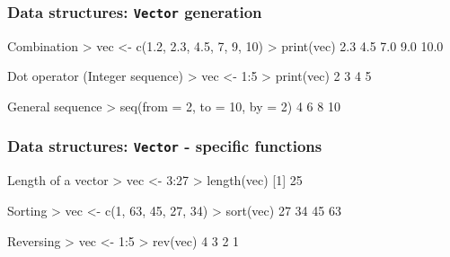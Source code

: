 \documentclass[ucs]{beamer}
\begin{document}
\begin{frame}
        \frametitle{Data structures: \texttt{Vector} generation}
    \begin{block}{Combination}
\ttfamily > vec <- c(1.2, 2.3, 4.5, 7, 9, 10)\newline
> print(vec)   2.3  4.5  7.0  9.0 10.0
     \end{block}

     \begin{block}{Dot operator (Integer sequence)}
\ttfamily > vec <- 1:5 \newline
> print(vec)  2 3 4 5
     \end{block}
   
     \begin{block}{General sequence}
\ttfamily >  seq(from = 2,  to = 10, by = 2) 4 6 8 10
     \end{block}
   
  \end{frame}

\begin{frame}
  \frametitle{Data structures: \texttt{Vector} - specific functions}

\begin{block}{Length of a vector}
  \ttfamily
  > vec <- 3:27 \newline
  > length(vec)
  [1] 25
\end{block}

\begin{block}{Sorting}
\ttfamily > vec <- c(1, 63, 45, 27, 34)\newline
> sort(vec) 27 34 45 63
\end{block}

\begin{block}{Reversing}
\ttfamily > vec <- 1:5\newline
> rev(vec) 4 3 2 1
\end{block}




\end{frame}
\end{document}
